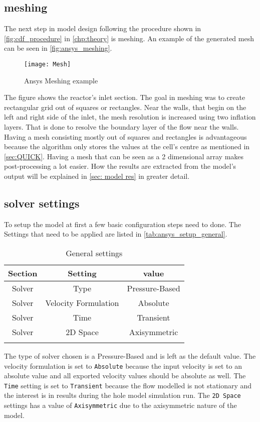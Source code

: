 \documentclass[../thesis.tex]{subfiles}
\begin{document}
\subsection{meshing}

The next step in model design following the procedure shown in \autoref{fig:cdf_procedure} in \autoref{chp:theory} is meshing. An example of the generated mesh can be seen in \autoref{fig:ansys_meshing}.
\begin{figure}[htb]
	\centering
	\texttt{[image: Mesh]}
	\caption{Ansys Meshing example}
	\label{fig:ansys_meshing}
\end{figure}
The figure shows the reactor's inlet section. The goal in meshing was to create rectangular grid out of squares or rectangles. Near the walls, that begin on the left and right side of the inlet, the mesh resolution is increased using two inflation layers. That is done to resolve the boundary layer of the flow near the walls. Having a mesh consisting mostly out of squares and rectangles is advantageous because the algorithm only stores the values at the cell's centre as mentioned in \autoref{sec:QUICK}. Having a mesh that can be seen as a 2 dimensional array makes post-processing a lot easier. How the results are extracted from the model's output will be explained in \autoref{sec: model res} in greater detail.

\subsection{solver settings}
\label{sec: setup}

To setup the model at first a few basic configuration steps need to done. The Settings that need to be applied are listed in \autoref{tab:ansys_setup_general}.

\begin{table} [htb]
	\centering
	\caption{General settings}
	\begin{tabular}{ ccc }
		\hline
		Section & Setting & value \\
		\hline
		Solver & Type & Pressure-Based \\
		Solver & Velocity Formulation & Absolute  \\
		Solver & Time &  Transient  \\
		Solver & 2D Space & Axisymmetric \\
		\hline
		\label{tab:ansys_setup_general}
	\end{tabular}
\end{table}
The type of solver chosen is a Pressure-Based and is left as the default value. The velocity formulation is set to \texttt{Absolute} because the input velocity is set to an absolute value and all exported velocity values should be absolute as well. The \texttt{Time} setting is set to \texttt{Transient} because the flow modelled is not stationary and the interest is in results during the hole model simulation run. The \texttt{2D Space} settings has a value of \texttt{Axisymmetric} due to the axisymmetric nature of the model. 
\end{document}
